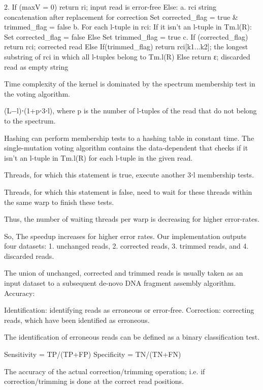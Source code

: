 \documentclass{llncs}
\begin{document}
2. If (maxV = 0) return ri;  input read is error-free
      Else: 
         a. rci  string concatenation after replacement for correction
            Set corrected\_flag = true \& trimmed\_flag = false
         b. For each l-tuple in rci:
               If it isn't an l-tuple in Tm.l(R):
                  Set corrected\_flag = false
               Else 
                  Set trimmed\_flag = true
         c. If (corrected\_flag) return rci; corrected read
             Else 
               If(trimmed\_flag) return rci[k1...k2]; the longest substring of rci in which all l-tuples belong to Tm.l(R)
               Else 
                   return ε; discarded read as empty string
         
Time complexity of the kernel is dominated by the spectrum membership test in  the voting algorithm.

(L−l)⋅(1+p⋅3⋅l), where p is the number of l-tuples of the read that do not belong to the spectrum. 

Hashing can perform membership tests to a hashing table in constant time. 
         The single-mutation voting algorithm contains the data-dependent that checks if it isn't an l-tuple in Tm.l(R) for each l-tuple in the given read.

Threads, for which this statement is true, execute another 3⋅l membership tests.

Threads, for which this statement is false, need to wait for these threads within the same warp to finish these tests.
  
Thus, the number of waiting threads per warp is decreasing for higher error-rates.

So, The speedup increases for higher error rates.
Our implementation outputs four datasets:
1. unchanged reads, 
2. corrected reads, 
3. trimmed reads, and
4. discarded reads. 

The union of unchanged, corrected and trimmed reads is usually taken as an input dataset to a subsequent de-novo DNA fragment assembly algorithm. 
Accuracy:

Identification: identifying reads as erroneous or error-free.
Correction: correcting reads, which have been identified as erroneous.

The identification of erroneous reads can be defined as a binary classification test.

Sensitivity = TP/(TP+FP)
Specificity = TN/(TN+FN)

The accuracy of the actual correction/trimming operation; i.e. if correction/trimming is done at the correct read positions.
\end{document}
